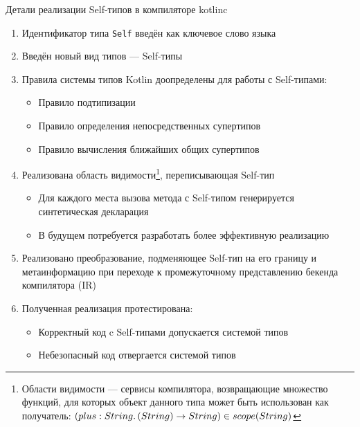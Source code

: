 \documentclass[usenames, dvipsnames]{beamer}
\begin{document}
\begin{frame}{Детали реализации Self-типов в компиляторе kotlinc}
        \begin{enumerate}
            \item Идентификатор типа \texttt{Self} введён как ключевое слово языка
            \item Введён новый вид типов --- Self-типы
            \item Правила системы типов Kotlin доопределены для работы с Self-типами:
            \begin{itemize}
                \item Правило подтипизации
                \item Правило определения непосредственных супертипов
                \item Правило вычисления ближайших общих супертипов
            \end{itemize}
            \item Реализована область видимости\footnote{Области видимости --- сервисы компилятора, возвращающие множество функций, для которых объект данного типа может быть использован как получатель: $(plus : String\ldotp(String) \to String) \in scope(String)$}, переписывающая Self-тип
            \begin{itemize}
                \item Для каждого места вызова метода с Self-типом генерируется синтетическая декларация
                \item В будущем потребуется разработать более эффективную реализацию
            \end{itemize}
            \item Реализовано преобразование, подменяющее Self-тип на его границу и метаинформацию при переходе к промежуточному представлению бекенда компилятора (IR)
            \item Полученная реализация протестирована:
            \begin{itemize}
                \item Корректный код c Self-типами допускается системой типов
                \item Небезопасный код отвергается системой типов
            \end{itemize}
        \end{enumerate}
    \end{frame}
\end{document}

